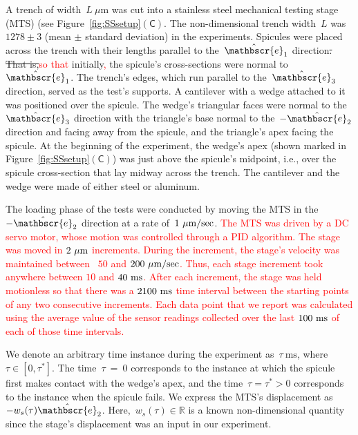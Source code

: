 \documentclass[preprint,10pt,times]{elsarticle}
\numberwithin{equation}{section}
\newcommand{\ndL}{L}
\newcommand{\physe}{\hat{\mathbscr{e}}} %
\newcommand{\pr}[1]{\left( #1 \right)}
\newcommand{\subf}[1]{\pr{\textsf{#1}}}
\begin{document}
A trench of width~$\ndL~\mu$m was cut into a stainless steel mechanical
testing stage (MTS) (see Figure~\ref{fig:SSsetup}$\subf{C}$. The
non-dimensional trench width~$\ndL$ was $1278\pm3$ (mean $\pm$ standard deviation) in
the experiments. Spicules were placed across the trench with their
lengths parallel to the~$\physe_1$ direction\sout{. That is,}\textcolor{red}{so that} initially\textcolor{red}{,}
the spicule's cross-sections were normal to~$\physe_1$. The trench's
edges, which run parallel to the~$\physe_3$ direction, served as
the test's supports. A cantilever with a wedge attached to it was
positioned over the spicule. The wedge's triangular faces were normal
to the~$\physe_3$ direction with the triangle's base normal to the~$-\physe_2$
direction and facing away from the spicule, and the triangle's apex
facing the spicule. At the beginning of the experiment, the wedge's
apex (shown marked in Figure~\ref{fig:SSsetup}$\subf{C}$) was just
above the spicule's midpoint, i.e., over the spicule cross-section
that lay midway across the trench. The cantilever and the wedge were
made of either steel or aluminum.

The loading phase of the tests were conducted by moving the MTS in
the~$-\physe_2$ direction at a rate of~$1~\rm\mu m/sec$.
\textcolor{red}{The MTS was driven by a DC servo motor, whose motion was controlled through a PID algorithm. The stage was moved in  $2~\mu \rm m$ increments. During the increment, the stage's velocity was maintained between ~$50$ and $200~\mu \rm m/sec$. Thus, each  stage increment took anywhere between $10$ and $40~\rm{ms}$. After each increment, the stage was held motionless so that there was a $2100~\rm{ms}$ time interval  between the starting points of any two consecutive increments. Each data point that we report was calculated using the  average value of the sensor readings collected over the last $100~\rm{ms}$ of each of those time intervals.
}

We denote
an arbitrary time instance during the experiment as~$\tau~\text{ms}$,
where~$\tau\in [0,\tau^*]$. The time~$\tau$~=~0 corresponds to
the instance at which the spicule first makes contact with the wedge's
apex, and the time~$\tau=\tau^*> 0$ corresponds to the instance
when the spicule fails. We express the MTS's displacement as~$-w_s(\tau)\physe_2$.
Here,~$w_s(\tau)\in\mathbb{R}$ is a known non-dimensional quantity
since the stage's displacement was an input in our experiment.
\end{document}
